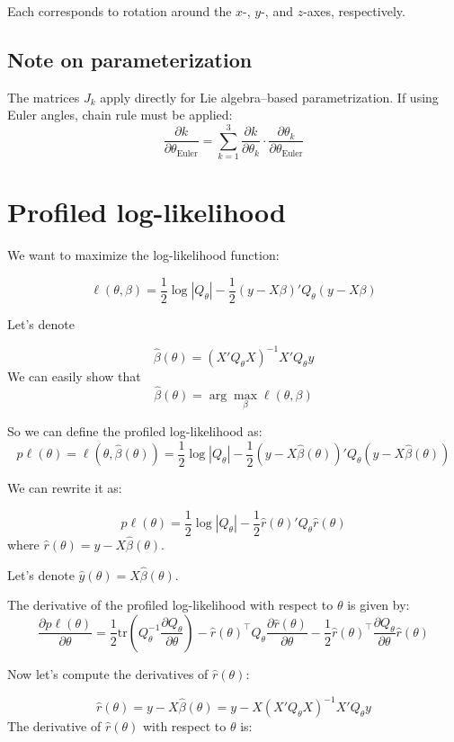 \documentclass{article}
\begin{document}
Each corresponds to rotation around the \( x \)-, \( y \)-, and \( z \)-axes, respectively.

\subsection*{Note on parameterization}

The matrices \( J_k \) apply directly for Lie algebra–based parametrization. If using Euler angles, chain rule must be applied:
\[
\frac{\partial k}{\partial \theta_{\text{Euler}}} = \sum_{k=1}^3 \frac{\partial k}{\partial \theta_k} \cdot \frac{\partial \theta_k}{\partial \theta_{\text{Euler}}}
\]


\section{Profiled log-likelihood}

We want to maximize the log-likelihood function:

\[\ell(\theta,\beta) = \frac{1}{2} \log |Q_\theta| -\frac{1}{2}(y-X\beta)'Q_\theta(y-X\beta) \]

Let's denote

\[\hat\beta(\theta) = (X'Q_\theta X)^{-1}X'Q_\theta y\]
We can easily show that  \[\hat\beta(\theta) = \arg\max_\beta \ell(\theta,\beta)\]

So we can define the profiled log-likelihood as:
\[p\ell(\theta) = \ell(\theta,\hat\beta(\theta)) = \frac{1}{2} \log |Q_\theta| -\frac{1}{2}(y-X\hat\beta(\theta))'Q_\theta(y-X\hat\beta(\theta)) \]

We can rewrite it as:

\[p\ell(\theta) = \frac{1}{2} \log |Q_\theta| -\frac{1}{2}\hat r(\theta)'Q_\theta\hat r(\theta) 
\]
where \(\hat r(\theta) = y-X\hat\beta(\theta)\).

Let's denote \( \hat y(\theta) = X\hat\beta(\theta) \).

The derivative of the profiled log-likelihood with respect to \(\theta\) is given by:
\[\frac{\partial p\ell(\theta)}{\partial \theta} = \frac{1}{2} \mathrm{tr}\left(Q_\theta^{-1} \frac{\partial Q_\theta}{\partial \theta}\right) 
 -  \hat r(\theta)^\top Q_\theta \frac{\partial \hat r(\theta)}{\partial \theta}
 -  \frac{1}{2}\hat r(\theta)^\top  \frac{\partial Q_\theta}{\partial \theta} \hat r(\theta) \]     
 
 Now let's compute the derivatives of \(\hat r(\theta)\):

\[\hat r(\theta) = y - X\hat\beta(\theta) = y - X(X'Q_\theta X)^{-1}X'Q_\theta y\]
The derivative of \(\hat r(\theta)\) with respect to \(\theta\) is:
\end{document}
